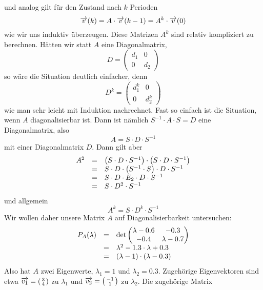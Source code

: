 \begin{beispiel}
und analog gilt für den Zustand nach $k$ Perioden
  	$$ \overrightarrow{v}(k) = A \cdot \overrightarrow{v}(k-1) = A^k \cdot \overrightarrow{v}(0) $$
wie wir uns induktiv überzeugen.
Diese Matrizen $A^k$ sind relativ kompliziert zu berechnen. Hätten wir statt $A$ eine Diagonalmatrix, 
  	$$ D = \left( \begin{matrix} d_1 & 0 \\ 0 & d_2 \end{matrix} \right) $$
so wäre die Situation deutlich einfacher, denn 
  	$$ D^k = \left( \begin{matrix} d_1^k & 0 \\ 0 & d_2^k \end{matrix} \right) $$
wie man sehr leicht mit Induktion nachrechnet. Fast so einfach ist die Situation, wenn $A$ diagonalisierbar ist. Dann ist 
nämlich $S^{-1} \cdot A \cdot S = D$ eine Diagonalmatrix, also 
  	$$ A = S \cdot D \cdot S^{-1} $$
mit einer Diagonalmatrix $D$. Dann gilt aber 
  	$$ \begin{array}  {l c l}
  	A^2 & = & \left( S \cdot D \cdot S^{-1} \right) \cdot \left( S \cdot D \cdot S^{-1} \right)  \\
  	& = &  S \cdot D \cdot \left( S^{-1} \cdot S \right) \cdot D \cdot S^{-1} \\
  	& = & S \cdot D \cdot E_2 \cdot D \cdot S^{-1} \\
  	& = & S \cdot D^2 \cdot S^{-1} 
  	\end{array} $$
und allgemein 
  	$$ A^k = S \cdot D^k \cdot S^{-1} $$
Wir wollen daher unsere Matrix $A$ auf Diagonalisierbarkeit untersuchen:
  	$$ \begin{array} {l c l} 
  	P_A(\lambda) & = & \textrm{det}  \left( \begin{matrix} \lambda - 0.6 & - 0.3 \\ 
	- 0.4 & \lambda - 0.7 \end{matrix} \right) \\
	& = & \lambda^2 - 1.3 \cdot \lambda + 0.3 \\
  	& = & (\lambda - 1) \cdot (\lambda - 0.3) 
  	\end{array} $$
Also hat $A$ zwei Eigenwerte, $\lambda_1 = 1$ und $\lambda_2 = 0.3$. Zugehörige Eigenvektoren sind etwa 
$\overrightarrow{v_1} = \left( \begin{smallmatrix} 3 \\ 4 \end{smallmatrix} \right)$ zu $\lambda_1$ und 
$\overrightarrow{v_2} = \left( \begin{smallmatrix} -1 \\ 1 \end{smallmatrix} \right)$ zu $\lambda_2$. Die zugehörige Matrix

\end{beispiel}
